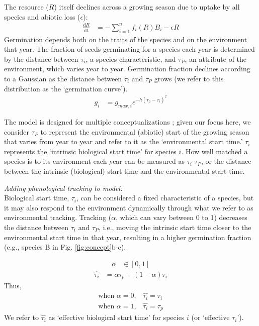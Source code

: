\documentclass[11pt,letterpaper]{article}
\begin{document}
The resource ($R$) itself declines across a growing season due to uptake by all species and abiotic loss ($\epsilon$):
\begin{align}
\frac{\mathrm{d}R}{\mathrm{d}t} & = - \sum_{i=1}^{n}f_{i}(R)B_{i} -\epsilon R
\end{align}
Germination depends both on the traits of the species and on the environment that year. The fraction of seeds germinating for a species each year is determined by the distance between $\tau_i$, a species characteristic, and $\tau_P$, an attribute of the environment, which varies year to year.  Germination fraction declines according to a Gaussian as the distance between $\tau_i$ and $\tau_P$ grows (we refer to this distribution as the `germination curve').  
\begin{align}
g_{i} & = g_{max,i}e^{-h(\tau_{p}-\tau_{i})^2} 
\end{align}

The model is designed for multiple conceptualizations \citep{Chesson:2004eo}; given our focus here, we consider $\tau_P$ to represent the environmental (abiotic) start of the growing season that varies from year to year and refer to it as the `environmental start time.'  $\tau_i$ represents the `intrinsic biological start time' for species $i$. How well matched a species is to its environment each year can be measured as $\tau_i$-$\tau_P$, or the distance between the intrinsic (biological) start time and the environmental start time. 

\noindent \emph{Adding phenological tracking to model:}\\
Biological start time, $\tau_i$, can be considered a fixed characteristic of a species, but it may also respond to the environment dynamically through what we refer to as environmental tracking. Tracking ($\alpha$, which can vary between 0 to 1) decreases the distance between $\tau_i$ and $\tau_P$, i.e., moving the intrinsic start time closer to the environmental start time in that year, resulting in a higher germination fraction (e.g., species B in Fig. \ref{fig:concept}b-c).

\begin{align*}
\alpha & \in [0, 1]  
\end{align*}
\begin{align}
\hat{\tau_{i}} & = \alpha \tau_{p} + (1-\alpha)\tau_{i}
\end{align}
\noindent Thus, 
\begin{align*}
\text{when } \alpha = 0, & \hat{\tau_{i}}=\tau_{i}\\
\text{when }  \alpha = 1, & \hat{\tau_{i}}=\tau_{p}
\end{align*}
We refer to $\hat{\tau_{i}}$ as `effective biological start time' for species $i$ (or `effective $\tau_i$'). 
\end{document}
